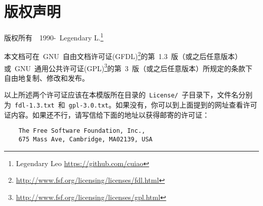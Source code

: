 \cleardoublepage
\chapter{版权声明}
版权所有~\textcopyright~1990-\the\year~Legendary L.\footnote{Legendary Leo \url{https://github.com/cuiao}}

本文档可在~GNU~自由文档许可证(GFDL)\footnote{\url{http://www.fsf.org/licensing/licenses/fdl.html}}的第~1.3~版（或之后任意版本）或~GNU~通用公共许可证(GPL)\footnote{\url{http://www.fsf.org/licensing/licenses/gpl.html}}的第~3~版（或之后任意版本）所规定的条款下自由地复制、修改和发布。


以上所述两个许可证应该在本模版所在目录的~\verb|License/|~子目录下，文件名分别为~\verb|fdl-1.3.txt|~和~\verb|gpl-3.0.txt|。如果没有，你可以到上面提到的网址查看许可证内容。如果还不行，请写信给下面的地址以获得邮寄的许可证：
\begin{verbatim}
    The Free Software Foundation, Inc.,
    675 Mass Ave, Cambridge, MA02139, USA
\end{verbatim}
